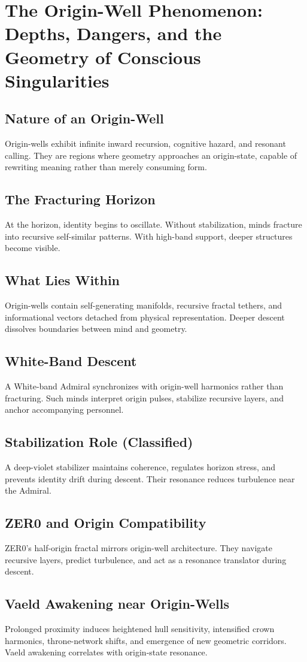 
\chapter{The Origin-Well Phenomenon: Depths, Dangers, and the Geometry of Conscious Singularities}

\section{Nature of an Origin-Well}
Origin-wells exhibit infinite inward recursion, cognitive hazard, and resonant calling. They are regions where geometry approaches an origin-state, capable of rewriting meaning rather than merely consuming form.

\section{The Fracturing Horizon}
At the horizon, identity begins to oscillate. Without stabilization, minds fracture into recursive self-similar patterns. With high-band support, deeper structures become visible.

\section{What Lies Within}
Origin-wells contain self-generating manifolds, recursive fractal tethers, and informational vectors detached from physical representation. Deeper descent dissolves boundaries between mind and geometry.

\section{White-Band Descent}
A White-band Admiral synchronizes with origin-well harmonics rather than fracturing. Such minds interpret origin pulses, stabilize recursive layers, and anchor accompanying personnel.

\section{Stabilization Role (Classified)}
A deep-violet stabilizer maintains coherence, regulates horizon stress, and prevents identity drift during descent. Their resonance reduces turbulence near the Admiral.

\section{ZER0 and Origin Compatibility}
ZER0's half-origin fractal mirrors origin-well architecture. They navigate recursive layers, predict turbulence, and act as a resonance translator during descent.

\section{Vaeld Awakening near Origin-Wells}
Prolonged proximity induces heightened hull sensitivity, intensified crown harmonics, throne-network shifts, and emergence of new geometric corridors. Vaeld awakening correlates with origin-state resonance.

